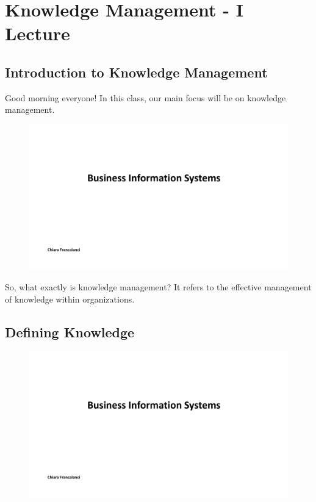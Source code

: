 \section{Knowledge Management - I Lecture}

\subsection{Introduction to Knowledge
    Management}\label{introduction-to-knowledge-management}

Good morning everyone! In this class, our main focus will be on
knowledge management.

\begin{figure}[!h]
    \centering
    \includegraphics[page=2, trim = 1.5cm 7cm 3cm 4.5cm, clip, width=\textwidth]{images/05 - KM.pdf}
\end{figure}

So, what exactly is knowledge management? It refers to the effective
management of knowledge within organizations.

\subsection{Defining Knowledge}\label{defining-knowledge}

\begin{figure}[!h]
    \centering
    \includegraphics[page=3, trim = 1.5cm 3cm 3cm 3.5cm, clip, width=\textwidth]{images/05 - KM.pdf}
\end{figure}

